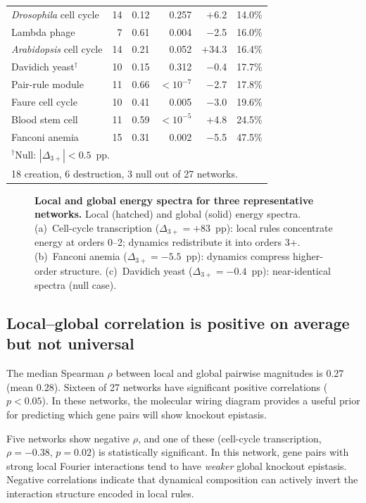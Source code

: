 \documentclass[10pt,letterpaper]{article}
\begin{document}
\begin{longtable}{lrrrrl}
\emph{Drosophila} cell cycle & 14 & 0.12 & 0.257 & $+$6.2 & 14.0\% \\
Lambda phage & 7 & 0.61 & 0.004 & $-$2.5 & 16.0\% \\
\emph{Arabidopsis} cell cycle & 14 & 0.21 & 0.052 & $+$34.3 & 16.4\% \\
Davidich yeast$^\dagger$ & 10 & 0.15 & 0.312 & $-$0.4 & 17.7\% \\
Pair-rule module & 11 & 0.66 & $< 10^{-7}$ & $-$2.7 & 17.8\% \\
Faure cell cycle & 10 & 0.41 & 0.005 & $-$3.0 & 19.6\% \\
Blood stem cell & 11 & 0.59 & $< 10^{-5}$ & $+$4.8 & 24.5\% \\
Fanconi anemia & 15 & 0.31 & 0.002 & $-$5.5 & 47.5\% \\
\midrule
\multicolumn{6}{l}{\footnotesize $^\dagger$Null: $|\Delta_{3+}| < 0.5$~pp.} \\
\multicolumn{6}{l}{\footnotesize 18 creation, 6 destruction, 3 null out of 27 networks.} \\
\end{longtable}


\begin{figure}[!h]
\caption{{\bf Local and global energy spectra for three representative networks.}
Local (hatched) and global (solid) energy spectra.
(a)~Cell-cycle transcription ($\Delta_{3+} = +83$~pp): local rules
concentrate energy at orders 0--2; dynamics redistribute it into
orders 3+. (b)~Fanconi anemia ($\Delta_{3+} = -5.5$~pp): dynamics
compress higher-order structure. (c)~Davidich yeast
($\Delta_{3+} = -0.4$~pp): near-identical spectra (null case).}
\label{fig:spectrum}
\end{figure}

\subsection*{Local--global correlation is positive on average but not universal}
\label{sec:rho}

The median Spearman $\rho$ between local and global pairwise
magnitudes is $0.27$ (mean $0.28$). Sixteen of 27 networks have
significant positive correlations ($p < 0.05$). In these networks,
the molecular wiring diagram provides a useful prior for predicting
which gene pairs will show knockout epistasis.

Five networks show negative $\rho$, and one of these
(cell-cycle transcription, $\rho = -0.38$, $p = 0.02$) is
statistically significant. In this network, gene pairs with strong
local Fourier interactions tend to have \emph{weaker} global knockout
epistasis. Negative correlations indicate that dynamical composition
can actively invert the interaction structure encoded in local rules.
\end{document}
